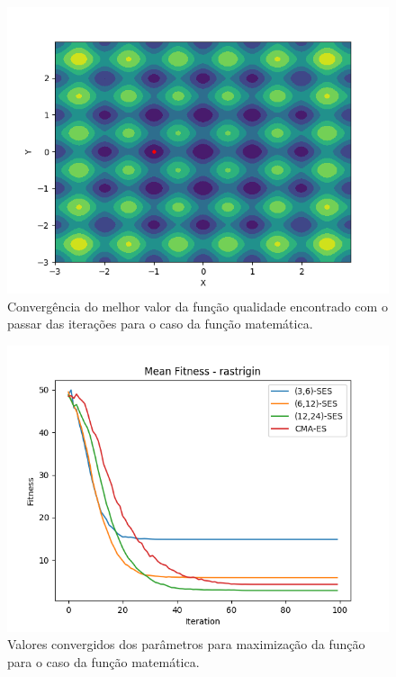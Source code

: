\documentclass[conference]{IEEEtran}
\begin{document}
\begin{figure}[htbp]
\centering
\centerline{\includegraphics[scale=0.4]{imagens/rastrigin/cmaes.png}}
\caption{Convergência do melhor valor da função qualidade encontrado com o passar das iterações para o caso da função matemática.}
\label{rastrigin/cmaes}
\end{figure}

\begin{figure}[htbp]
\centering
\centerline{\includegraphics[scale=0.4]{imagens/rastrigin/mean_fitness.png}}
\caption{Valores convergidos dos parâmetros para maximização da função para o caso da função matemática.}
\label{rastrigin/mean_fitness}
\end{figure}
\end{document}
